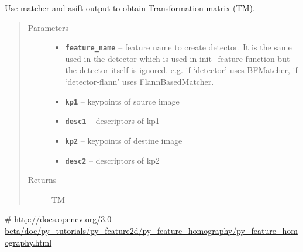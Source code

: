\documentclass[letterpaper,10pt,english]{sphinxmanual}
\begin{document}
\begin{fulllineitems}
\label{RRtoolbox.lib:RRtoolbox.lib.descriptors.MATCH}
Use matcher and asift output to obtain Transformation matrix (TM).
\begin{quote}\begin{description}
\item[{Parameters}] \leavevmode\begin{itemize}
\item {} 
\textbf{\texttt{feature\_name}} -- feature name to create detector. It is the same used in the detector
which is used in init\_feature function but the detector itself is ignored.
e.g. if `detector' uses BFMatcher, if `detector-flann' uses FlannBasedMatcher.

\item {} 
\textbf{\texttt{kp1}} -- keypoints of source image

\item {} 
\textbf{\texttt{desc1}} -- descriptors of kp1

\item {} 
\textbf{\texttt{kp2}} -- keypoints of destine image

\item {} 
\textbf{\texttt{desc2}} -- descriptors of kp2

\end{itemize}

\item[{Returns}] \leavevmode
TM

\end{description}\end{quote}

\# \href{http://docs.opencv.org/3.0-beta/doc/py\_tutorials/py\_feature2d/py\_feature\_homography/py\_feature\_homography.html}{http://docs.opencv.org/3.0-beta/doc/py\_tutorials/py\_feature2d/py\_feature\_homography/py\_feature\_homography.html}

\end{fulllineitems}

\end{document}

